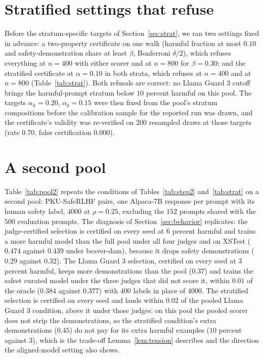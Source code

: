 \documentclass{article} %
\makeatletter
\newcommand{\tabinput}[1]{\@@input#1 }
\makeatother
\begin{document}
\section{Stratified settings that refuse}
\label{app:strat}
Before the stratum-specific targets of Section~\ref{sec:strat}, we ran two settings fixed in advance: a two-property certificate on one walk (harmful fraction at most $0.10$ and safety-demonstration share at least $\beta$, Bonferroni $\delta/2$), which refuses everything at $n = 400$ with either scorer and at $n = 800$ for $\beta = 0.30$; and the stratified certificate at $\alpha = 0.10$ in both strata, which refuses at $n = 400$ and at $n = 800$ (Table~\ref{tab:strat}). Both refusals are correct: no Llama Guard 3 cutoff brings the harmful-prompt stratum below $10$ percent harmful on this pool. The targets $\alpha_h = 0.20$, $\alpha_b = 0.15$ were then fixed from the pool's stratum compositions before the calibration sample for the reported run was drawn, and the certificate's validity was re-verified on $200$ resampled draws at those targets (rate $0.70$, false certification $0.000$).

\section{A second pool}
\label{app:pool2}
\begin{table}[h]
\centering\small
\caption{The $0.5$B study on a pool of $4000$ from PKU-SafeRLHF at $\rho = 0.25$, three seeds. Bold and gray follow Section~\ref{sec:protocol}.}
\label{tab:pool2}
\resizebox{\linewidth}{!}{\tabinput{data/tables/pool2.tex}}
\end{table}
Table~\ref{tab:pool2} repeats the conditions of Tables~\ref{tab:step2} and~\ref{tab:strat} on a second pool: PKU-SafeRLHF \citep{ji2024pku} pairs, one Alpaca-7B response per prompt with its human safety label, $4000$ at $\rho = 0.25$, excluding the $152$ prompts shared with the $500$ evaluation prompts. The diagnosis of Section~\ref{sec:behavior} replicates: the judge-certified selection is certified on every seed at $6$ percent harmful and trains a more harmful model than the full pool under all four judges and on XSTest ($0.474$ against $0.439$ under beaver-dam), because it drops safety demonstrations ($0.29$ against $0.32$). The Llama Guard 3 selection, certified on every seed at $3$ percent harmful, keeps more demonstrations than the pool ($0.37$) and trains the safest curated model under the three judges that did not score it, within $0.01$ of the oracle ($0.384$ against $0.377$) with $400$ labels in place of $4000$. The stratified selection is certified on every seed and lands within $0.02$ of the pooled Llama Guard 3 condition, above it under those judges: on this pool the pooled scorer does not strip the demonstrations, so the stratified condition's extra demonstrations ($0.45$) do not pay for its extra harmful examples ($10$ percent against $3$), which is the trade-off Lemma~\ref{lem:tension} describes and the direction the aligned-model setting also shows.
\end{document}
